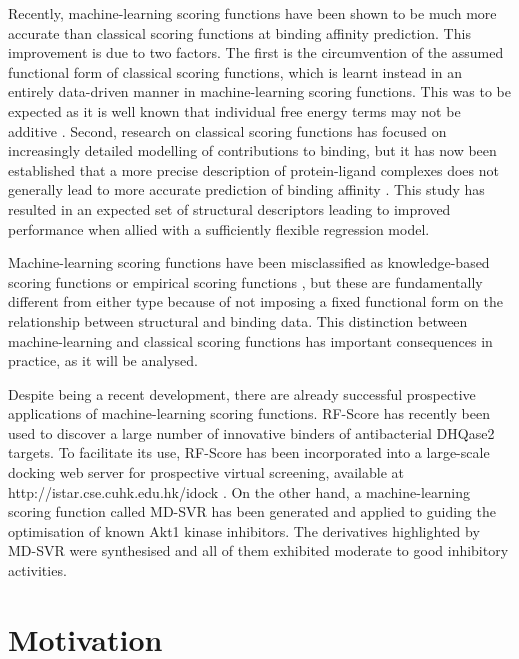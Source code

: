 Recently, machine-learning scoring functions have been shown \citep{564} to be much more accurate than classical scoring functions at binding affinity prediction. This improvement is due to two factors. The first is the circumvention of the assumed functional form of classical scoring functions, which is learnt instead in an entirely data-driven manner in machine-learning scoring functions. This was to be expected as it is well known that individual free energy terms may not be additive \citep{1471,1416}. Second, research on classical scoring functions has focused on increasingly detailed modelling of contributions to binding, but it has now been established that a more precise description of protein-ligand complexes does not generally lead to more accurate prediction of binding affinity \citep{1370}. This study has resulted in an expected set of structural descriptors leading to improved performance when allied with a sufficiently flexible regression model.

Machine-learning scoring functions have been misclassified as knowledge-based scoring functions \citep{1373,1372} or empirical scoring functions \citep{1305}, but these are fundamentally different from either type because of not imposing a fixed functional form on the relationship between structural and binding data. This distinction between machine-learning and classical scoring functions has important consequences in practice, as it will be analysed.

Despite being a recent development, there are already successful prospective applications of machine-learning scoring functions. RF-Score \citep{564} has recently been used \citep{1281} to discover a large number of innovative binders of antibacterial DHQase2 targets. To facilitate its use, RF-Score has been incorporated into a large-scale docking web server for prospective virtual screening, available at http://istar.cse.cuhk.edu.hk/idock \citep{1362}. On the other hand, a machine-learning scoring function called MD-SVR has been generated and applied \citep{1452} to guiding the optimisation of known Akt1 kinase inhibitors. The derivatives highlighted by MD-SVR were synthesised and all of them exhibited moderate to good inhibitory activities.

\section{Motivation}

